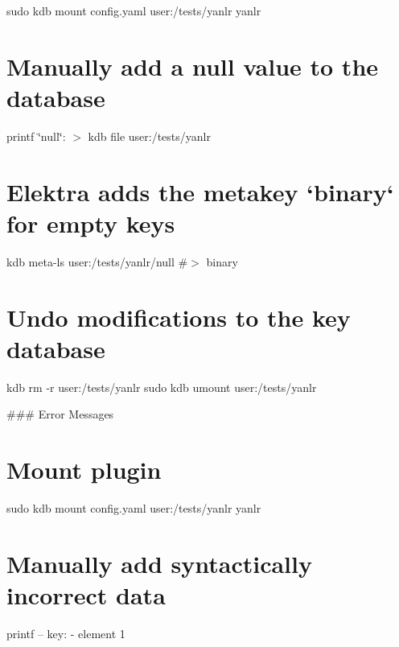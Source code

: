 sudo kdb mount config.\+yaml user\+:/tests/yanlr yanlr\hypertarget{autotoc_md897_autotoc_md920}{}\section{Manually add a null value to the database}\label{autotoc_md897_autotoc_md920}
printf \textquotesingle{}\char`\"{}null\char`\"{}\+:\textquotesingle{} $>$ {\ttfamily kdb file user\+:/tests/yanlr}\hypertarget{autotoc_md897_autotoc_md921}{}\section{Elektra adds the metakey `binary` for empty keys}\label{autotoc_md897_autotoc_md921}
kdb meta-\/ls user\+:/tests/yanlr/null \#$>$ binary\hypertarget{autotoc_md897_autotoc_md922}{}\section{Undo modifications to the key database}\label{autotoc_md897_autotoc_md922}
kdb rm -\/r user\+:/tests/yanlr sudo kdb umount user\+:/tests/yanlr 
\begin{DoxyCode}
### Error Messages
\end{DoxyCode}
 \hypertarget{autotoc_md897_autotoc_md923}{}\section{Mount plugin}\label{autotoc_md897_autotoc_md923}
sudo kdb mount config.\+yaml user\+:/tests/yanlr yanlr\hypertarget{autotoc_md897_autotoc_md924}{}\section{Manually add syntactically incorrect data}\label{autotoc_md897_autotoc_md924}
printf -- \textquotesingle{}key\+: -\/ element 1~\newline
